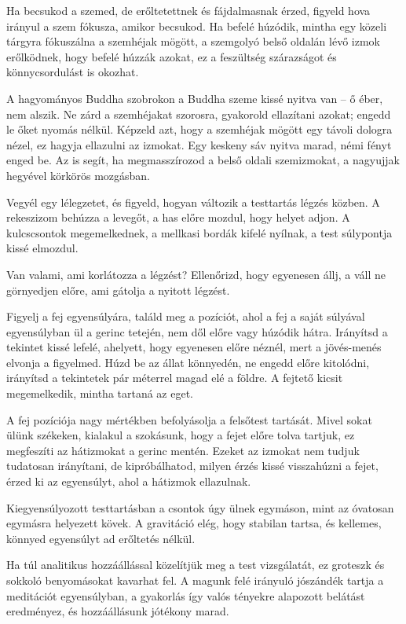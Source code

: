 Ha becsukod a szemed, de erőltetettnek és fájdalmasnak érzed, figyeld
hova irányul a szem fókusza, amikor becsukod. Ha befelé húzódik, mintha
egy közeli tárgyra fókuszálna a szemhéjak mögött, a szemgolyó belső
oldalán lévő izmok erőlködnek, hogy befelé húzzák azokat, ez a
feszültség szárazságot és könnycsordulást is okozhat.

A hagyományos Buddha szobrokon a Buddha szeme kissé nyitva van -- ő
éber, nem alszik. Ne zárd a szemhéjakat szorosra, gyakorold ellazítani
azokat; engedd le őket nyomás nélkül. Képzeld azt, hogy a szemhéjak
mögött egy távoli dologra nézel, ez hagyja ellazulni az izmokat. Egy
keskeny sáv nyitva marad, némi fényt enged be. Az is segít, ha
megmasszírozod a belső oldali szemizmokat, a nagyujjak hegyével körkörös
mozgásban.

Vegyél egy lélegzetet, és figyeld, hogyan változik a testtartás légzés
közben. A rekeszizom behúzza a levegőt, a has előre mozdul, hogy helyet
adjon. A kulcscsontok megemelkednek, a mellkasi bordák kifelé nyílnak, a
test súlypontja kissé elmozdul.

Van valami, ami korlátozza a légzést? Ellenőrizd, hogy egyenesen állj, a
váll ne görnyedjen előre, ami gátolja a nyitott légzést.

Figyelj a fej egyensúlyára, találd meg a pozíciót, ahol a fej a saját
súlyával egyensúlyban ül a gerinc tetején, nem dől előre vagy húzódik
hátra. Irányítsd a tekintet kissé lefelé, ahelyett, hogy egyenesen előre
néznél, mert a jövés-menés elvonja a figyelmed. Húzd be az állat
könnyedén, ne engedd előre kitolódni, irányítsd a tekintetek pár
méterrel magad elé a földre. A fejtető kicsit megemelkedik, mintha
tartaná az eget.

A fej pozíciója nagy mértékben befolyásolja a felsőtest tartását. Mivel
sokat ülünk székeken, kialakul a szokásunk, hogy a fejet előre tolva
tartjuk, ez megfeszíti az hátizmokat a gerinc mentén. Ezeket az izmokat
nem tudjuk tudatosan irányítani, de kipróbálhatod, milyen érzés kissé
visszahúzni a fejet, érzed ki az egyensúlyt, ahol a hátizmok ellazulnak.

Kiegyensúlyozott testtartásban a csontok úgy ülnek egymáson, mint az
óvatosan egymásra helyezett kövek. A gravitáció elég, hogy stabilan
tartsa, és kellemes, könnyed egyensúlyt ad erőltetés nélkül.

Ha túl analitikus hozzáállással közelítjük meg a test vizsgálatát, ez
groteszk és sokkoló benyomásokat kavarhat fel. A magunk felé irányuló
jószándék tartja a meditációt egyensúlyban, a gyakorlás így valós
tényekre alapozott belátást eredményez, és hozzáállásunk jótékony marad.

